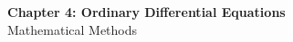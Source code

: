 \documentclass[12pt]{article}
\begin{document}
\begin{center}
  {\LARGE\bfseries Chapter 4: Ordinary Differential Equations}\\[0.25em]
  {\large Mathematical Methods}\\[0.15em]
\end{center}

\end{document}
